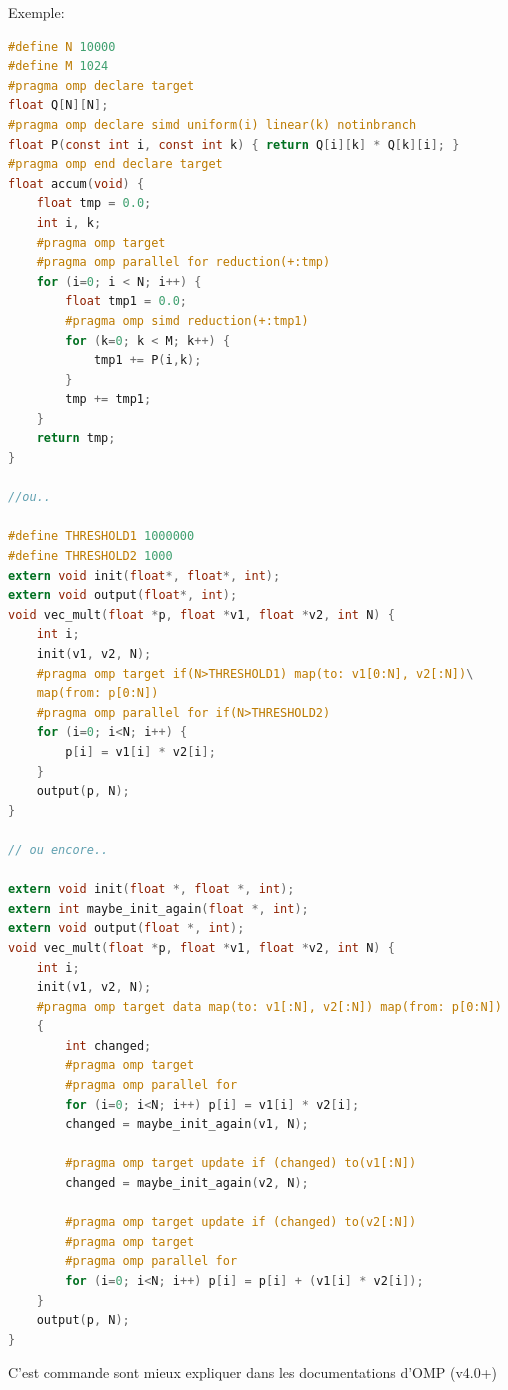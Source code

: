 \documentclass[oneside]{book}
\begin{document}
Exemple:
\begin{lstlisting}[language=c]
#define N 10000
#define M 1024
#pragma omp declare target
float Q[N][N];
#pragma omp declare simd uniform(i) linear(k) notinbranch
float P(const int i, const int k) { return Q[i][k] * Q[k][i]; }
#pragma omp end declare target
float accum(void) {
	float tmp = 0.0;
	int i, k;
	#pragma omp target
	#pragma omp parallel for reduction(+:tmp)
	for (i=0; i < N; i++) {
		float tmp1 = 0.0;
		#pragma omp simd reduction(+:tmp1)
		for (k=0; k < M; k++) {
			tmp1 += P(i,k);
		}
		tmp += tmp1;
	}
	return tmp;
}

//ou..

#define THRESHOLD1 1000000
#define THRESHOLD2 1000
extern void init(float*, float*, int);
extern void output(float*, int);
void vec_mult(float *p, float *v1, float *v2, int N) {
	int i;
	init(v1, v2, N);
	#pragma omp target if(N>THRESHOLD1) map(to: v1[0:N], v2[:N])\
	map(from: p[0:N])
	#pragma omp parallel for if(N>THRESHOLD2)
	for (i=0; i<N; i++) {
		p[i] = v1[i] * v2[i];
	}
	output(p, N);
}

// ou encore..

extern void init(float *, float *, int);
extern int maybe_init_again(float *, int);
extern void output(float *, int);
void vec_mult(float *p, float *v1, float *v2, int N) {
	int i;
	init(v1, v2, N);
	#pragma omp target data map(to: v1[:N], v2[:N]) map(from: p[0:N])
	{ 
		int changed;
		#pragma omp target
		#pragma omp parallel for
		for (i=0; i<N; i++) p[i] = v1[i] * v2[i];
		changed = maybe_init_again(v1, N);
		
		#pragma omp target update if (changed) to(v1[:N])
		changed = maybe_init_again(v2, N);

		#pragma omp target update if (changed) to(v2[:N])
		#pragma omp target
		#pragma omp parallel for
		for (i=0; i<N; i++) p[i] = p[i] + (v1[i] * v2[i]);
	}
	output(p, N);
}
\end{lstlisting}
C'est commande sont mieux expliquer dans les documentations d'OMP (v4.0+)
\end{document}
